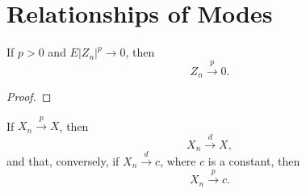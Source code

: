 \section{Relationships of Modes}

\begin{lemma}
	If \(p>0\) and \(E\left|Z_{n}\right|^{p}\rightarrow 0\), then
	\begin{equation}
		Z_{n}\stackrel{p}{\rightarrow}0.
	\end{equation}
\end{lemma}

\begin{proof}

\end{proof}

\begin{theorem}
	If \(X_{n}\stackrel{p}{\rightarrow}X\), then
	\begin{equation}
		X_{n}\stackrel{d}{\rightarrow}X,
	\end{equation}
	and that, conversely, if \(X_{n}\stackrel{d}{\rightarrow}c\), where \(c\) is a constant, then
	\begin{equation}
		X_{n}\stackrel{p}{\rightarrow}c.
	\end{equation}
\end{theorem}

